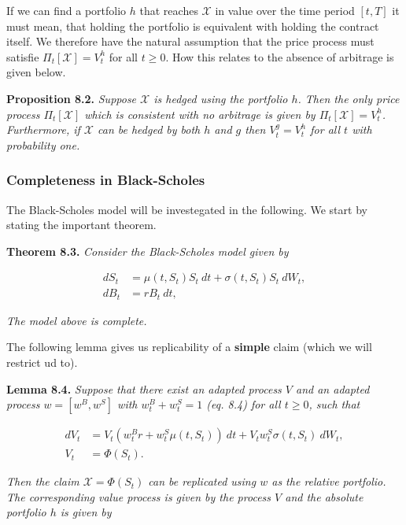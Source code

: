 \documentclass[
]{article}
\begin{document}
If we can find a portfolio \(h\) that reaches \(\mathcal{X}\) in value
over the time period \([t,T]\) it must mean, that holding the portfolio
is equivalent with holding the contract itself. We therefore have the
natural assumption that the price process must satisfie
\(\Pi_t[\mathcal{X}]=V_t^h\) for all \(t\ge 0\). How this relates to the
absence of arbitrage is given below.

\textbf{Proposition 8.2.} \emph{Suppose \(\mathcal{X}\) is hedged using
the portfolio \(h\). Then the only price process \(\Pi_t[\mathcal{X}]\)
which is consistent with no arbitrage is given by
\(\Pi_t[\mathcal{X}]=V_t^h\). Furthermore, if \(\mathcal{X}\) can be
hedged by both \(h\) and \(g\) then \(V_t^g=V_t^h\) for all \(t\) with
probability one.}

\hypertarget{completeness-in-black-scholes}{%
\subsubsection{Completeness in
Black-Scholes}\label{completeness-in-black-scholes}}

The Black-Scholes model will be investegated in the following. We start
by stating the important theorem.

\textbf{Theorem 8.3.} \emph{Consider the Black-Scholes model given by}

\begin{align*}
dS_t&=\mu(t,S_t) S_t\ dt+\sigma(t,S_t) S_t\ dW_t,\tag{8.2}\\
dB_t&=r B_t\ dt,\tag{8.3}
\end{align*}

\emph{The model above is complete.}

The following lemma gives us replicability of a \textbf{simple} claim
(which we will restrict ud to).

\textbf{Lemma 8.4.} \emph{Suppose that there exist an adapted process
\(V\) and an adapted process \(w=[w^B,w^S]\) with \(w^B_t+w^S_t=1\) (eq.
8.4) for all \(t\ge 0\), such that}

\begin{align*}
dV_t&=V_t(w_t^Br+w_t^S\mu(t,S_t))\ dt+V_tw_t^S\sigma(t,S_t)\ dW_t,\tag{8.5}\\
V_t&=\Phi(S_t).\tag{8.5}
\end{align*}

\emph{Then the claim \(\mathcal{X}=\Phi(S_t)\) can be replicated using
\(w\) as the relative portfolio. The corresponding value process is
given by the process \(V\) and the absolute portfolio \(h\) is given by}
\end{document}
